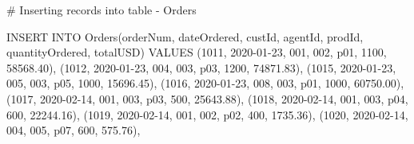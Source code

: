 \documentclass[
  letterpaper,
  DIV=11,
  numbers=noendperiod]{scrreprt}
\newenvironment{Shaded}{\begin{snugshade}}{\end{snugshade}}
\newcommand{\CommentTok}[1]{\textcolor[rgb]{0.37,0.37,0.37}{#1}}
\newcommand{\DecValTok}[1]{\textcolor[rgb]{0.68,0.00,0.00}{#1}}
\newcommand{\FloatTok}[1]{\textcolor[rgb]{0.68,0.00,0.00}{#1}}
\newcommand{\FunctionTok}[1]{\textcolor[rgb]{0.28,0.35,0.67}{#1}}
\newcommand{\NormalTok}[1]{\textcolor[rgb]{0.00,0.23,0.31}{#1}}
\newcommand{\StringTok}[1]{\textcolor[rgb]{0.13,0.47,0.30}{#1}}
\begin{document}
\begin{Shaded}
\begin{Highlighting}[]
\CommentTok{\# Inserting records into table {-} Orders }

\NormalTok{INSERT INTO }\FunctionTok{Orders}\NormalTok{(orderNum, dateOrdered, custId, agentId, prodId, quantityOrdered, totalUSD)}
\NormalTok{VALUES}
\NormalTok{(}\DecValTok{1011}\NormalTok{, }\StringTok{\textquotesingle{}2020{-}01{-}23\textquotesingle{}}\NormalTok{, }\DecValTok{001}\NormalTok{, }\DecValTok{002}\NormalTok{, }\StringTok{\textquotesingle{}p01\textquotesingle{}}\NormalTok{, }\DecValTok{1100}\NormalTok{, }\FloatTok{58568.40}\NormalTok{),}
\NormalTok{(}\DecValTok{1012}\NormalTok{, }\StringTok{\textquotesingle{}2020{-}01{-}23\textquotesingle{}}\NormalTok{, }\DecValTok{004}\NormalTok{, }\DecValTok{003}\NormalTok{, }\StringTok{\textquotesingle{}p03\textquotesingle{}}\NormalTok{, }\DecValTok{1200}\NormalTok{, }\FloatTok{74871.83}\NormalTok{),}
\NormalTok{(}\DecValTok{1015}\NormalTok{, }\StringTok{\textquotesingle{}2020{-}01{-}23\textquotesingle{}}\NormalTok{, }\DecValTok{005}\NormalTok{, }\DecValTok{003}\NormalTok{, }\StringTok{\textquotesingle{}p05\textquotesingle{}}\NormalTok{, }\DecValTok{1000}\NormalTok{, }\FloatTok{15696.45}\NormalTok{),}
\NormalTok{(}\DecValTok{1016}\NormalTok{, }\StringTok{\textquotesingle{}2020{-}01{-}23\textquotesingle{}}\NormalTok{, }\DecValTok{008}\NormalTok{, }\DecValTok{003}\NormalTok{, }\StringTok{\textquotesingle{}p01\textquotesingle{}}\NormalTok{, }\DecValTok{1000}\NormalTok{, }\FloatTok{60750.00}\NormalTok{),}
\NormalTok{(}\DecValTok{1017}\NormalTok{, }\StringTok{\textquotesingle{}2020{-}02{-}14\textquotesingle{}}\NormalTok{, }\DecValTok{001}\NormalTok{, }\DecValTok{003}\NormalTok{, }\StringTok{\textquotesingle{}p03\textquotesingle{}}\NormalTok{, }\DecValTok{500}\NormalTok{, }\FloatTok{25643.88}\NormalTok{),}
\NormalTok{(}\DecValTok{1018}\NormalTok{, }\StringTok{\textquotesingle{}2020{-}02{-}14\textquotesingle{}}\NormalTok{, }\DecValTok{001}\NormalTok{, }\DecValTok{003}\NormalTok{, }\StringTok{\textquotesingle{}p04\textquotesingle{}}\NormalTok{, }\DecValTok{600}\NormalTok{, }\FloatTok{22244.16}\NormalTok{),}
\NormalTok{(}\DecValTok{1019}\NormalTok{, }\StringTok{\textquotesingle{}2020{-}02{-}14\textquotesingle{}}\NormalTok{, }\DecValTok{001}\NormalTok{, }\DecValTok{002}\NormalTok{, }\StringTok{\textquotesingle{}p02\textquotesingle{}}\NormalTok{, }\DecValTok{400}\NormalTok{, }\FloatTok{1735.36}\NormalTok{),}
\NormalTok{(}\DecValTok{1020}\NormalTok{, }\StringTok{\textquotesingle{}2020{-}02{-}14\textquotesingle{}}\NormalTok{, }\DecValTok{004}\NormalTok{, }\DecValTok{005}\NormalTok{, }\StringTok{\textquotesingle{}p07\textquotesingle{}}\NormalTok{, }\DecValTok{600}\NormalTok{, }\FloatTok{575.76}\NormalTok{),}

\end{Highlighting}
\end{Shaded}
\end{document}

